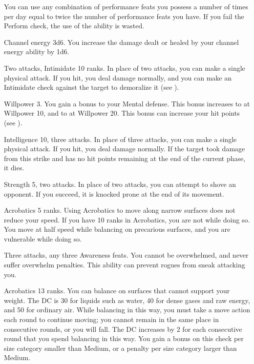 You can use any combination of performance feats you possess a number of times per day equal to twice the number of performance feats you have.
If you fail the Perform check, the use of the ability is wasted.

\featpre Channel energy 3d6.
\featben You increase the damage dealt or healed by your channel energy ability by 1d6.

\featpres Two attacks, Intimidate 10 ranks.
\featben In place of two attacks, you can make a single physical attack.
If you hit, you deal damage normally, and you can make an Intimidate check against the target to demoralize it (see ).

\featpre Willpower 3.
\featben You gain a  bonus to your Mental defense.
This bonus increases to  at Willpower 10, and to  at Willpower 20.
This bonus can increase your hit points (see ).

\featpre Intelligence 10, three attacks.
\featben In place of three attacks, you can make a single physical attack.
If you hit, you deal damage normally.
If the target took damage from this strike and has no hit points remaining at the end of the current phase, it dies.

\featpre Strength 5, two attacks.
\featben In place of two attacks, you can attempt to shove an opponent.
If you succeed, it is knocked prone at the end of its movement.

\featpre Acrobatics 5 ranks.
\featben Using Acrobatics to move along narrow surfaces does not reduce your speed.
If you have 10 ranks in Acrobatics, you are not \vulnerable while doing so.
You move at half speed while balancing on precarious surfaces, and you are vulnerable while doing so.

\featpres Three attacks, any three Awareness feats.
\featben You cannot be overwhelmed, and never suffer overwhelm penalties.
This ability can prevent rogues from sneak attacking you.

\featpre Acrobatics 13 ranks.
\featben You can balance on surfaces that cannot support your weight.
The DC is 30 for liquids such as water, 40 for dense gases and raw energy, and 50 for ordinary air.
While balancing in this way, you must take a move action each round to continue moving; you cannot remain in the same place in consecutive rounds, or you will fall.
The DC increases by 2 for each consecutive round that you spend balancing in this way.
You gain a  bonus on this check per size category smaller than Medium, or a  penalty per size category larger than Medium.

